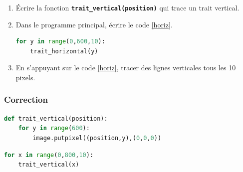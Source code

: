 \documentclass[svgnames,11pt]{beamer}
\begin{document}
\begin{frame}[fragile]
    \frametitle{}

    \begin{activite}
    \begin{enumerate}
        \item Écrire la fonction \textbf{\texttt{trait\_vertical(position)}} qui trace un trait vertical.
        \item Dans le programme principal, écrire le code \ref{horiz}.
\begin{center}
\begin{lstlisting}[language=Python , basicstyle=\ttfamily\small, xleftmargin=2em, xrightmargin=2em]
for y in range(0,600,10):
    trait_horizontal(y)
\end{lstlisting}
\label{horiz}
\end{center}
\item En s'appuyant sur le code \ref{horiz}, tracer des lignes verticales tous les 10 pixels.
    \end{enumerate}
    \end{activite}

\end{frame}
\begin{frame}[fragile]
    \frametitle{Correction}

\begin{center}
\begin{lstlisting}[language=Python , basicstyle=\ttfamily\small, xleftmargin=2em, xrightmargin=2em]
def trait_vertical(position):
    for y in range(600):
        image.putpixel((position,y),(0,0,0))
\end{lstlisting}
\end{center}
\begin{center}
\begin{lstlisting}[language=Python , basicstyle=\ttfamily\small, xleftmargin=2em, xrightmargin=2em]
for x in range(0,800,10):
    trait_vertical(x)
\end{lstlisting}
\end{center}

\end{frame}
\end{document}
